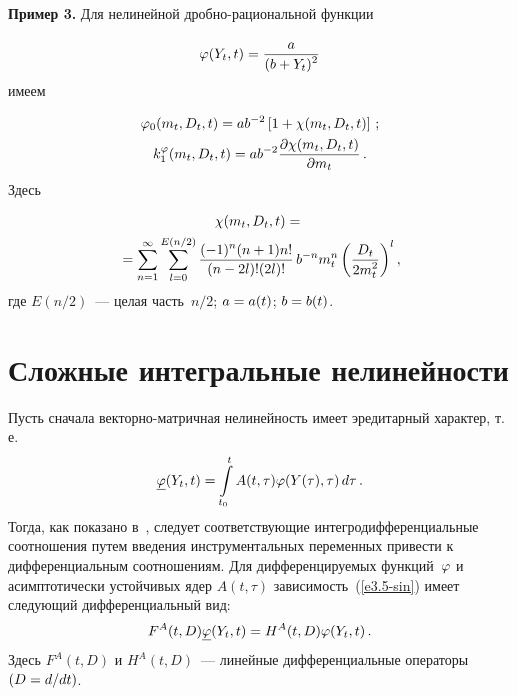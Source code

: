 \begin{multicols}{2}
\smallskip

\noindent
\textbf{Пример 3.}
Для нелинейной дроб\-но-ра\-ци\-о\-наль\-ной функции

\noindent
\begin{equation*}
\vrp (Y_t, t) = \fr{a}{(b+Y_t)^2} %
\end{equation*}
имеем

\vspace*{-3pt}

\noindent
\begin{gather*}
\vrp_0 (m_t, D_t, t) =a b^{-2} \lk 1+ \chi (m_t, D_t, t)\rk\,; %
\\
k_1^\vrp (m_t, D_t, t) =  a b^{-2}\fr{\prt \chi (m_t, D_t, t)}{\prt m_t}\,. %
\end{gather*}
Здесь

\vspace*{-3pt}

\noindent
\begin{multline*}
\chi (m_t, D_t, t) ={}\\
{}=\sss_{n=1}^\infty \sss_{l=0}^{E(n/2)}
\fr{(-1)^n (n+1) n!}{(n-2l)! (2l)!}\, b^{-n} m_t^n \left( \fr{D_t}{ 2 m_t^2}
\right)^l, %
\end{multline*}
где  $E(n/2)$~--- целая часть~$n/2$; $a\hm=a(t)$; $b\hm= b(t)$.

\vspace*{-6pt}

\section{Сложные интегральные нелинейности}

\vspace*{-2pt}

Пусть сначала векторно-матричная нелинейность имеет эредитарный характер, т.\,е.\
\begin{equation}
\underline{\varphi} (Y_t, t) =\int\limits_{t_0}^t A(t,\tau) \varphi (Y(\tau), \tau) \,d\tau\,.
\label{e6.1-sin}
\end{equation}
Тогда, как показано в~\cite{6-sin, 5-sin, 7-sin}, следует соответст\-ву\-ющие
интегродифференциальные соотношения путем введения  инструментальных
переменных привести к дифференциальным соотношениям.  Для
дифференцируемых функций~$\varphi$ и асимптотически устойчивых ядер
$A(t,\tau)$ зависимость~(\ref{e3.5-sin}) имеет следующий дифференциальный вид:
\begin{equation*}
F^A (t, D) \underline{\vrp} (Y_t, t) = H^A (t, D) \vrp (Y_t, t)\,. %
\end{equation*}
Здесь $F^A (t, D)$ и  $H^A (t, D)$~--- линейные дифференциальные операторы $(D\hm= d/dt)$.


\end{multicols}
